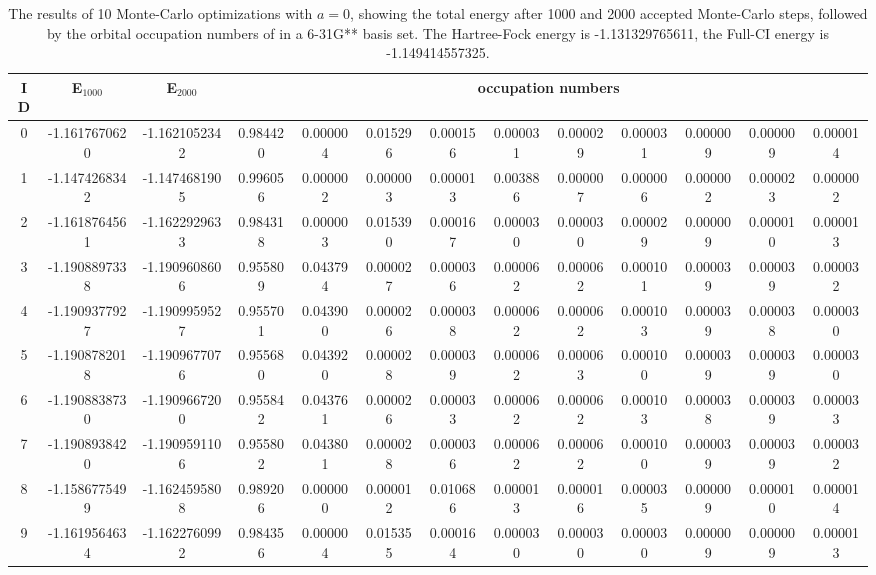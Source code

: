 \documentclass[pra,nofootinbib]{revtex4-1}
\newcommand{\dlabel}[1]{\text{#1}\label{#1}}
\begin{document}
\begin{table}
\begin{tabular}{|c|c|c|cccccccccc|}
\hline\hline 
ID & E$_{1000}$ & E$_{2000}$ & \multicolumn{10}{c}{occupation numbers} \\
\hline 
0 & -1.1617670620 & -1.1621052342 & 0.984420 & 0.000004 & 0.015296 & 0.000156 & 0.000031 & 0.000029 & 0.000031 & 0.000009 & 0.000009 & 0.000014 \\
1 & -1.1474268342 & -1.1474681905 & 0.996056 & 0.000002 & 0.000003 & 0.000013 & 0.003886 & 0.000007 & 0.000006 & 0.000002 & 0.000023 & 0.000002 \\
2 & -1.1618764561 & -1.1622929633 & 0.984318 & 0.000003 & 0.015390 & 0.000167 & 0.000030 & 0.000030 & 0.000029 & 0.000009 & 0.000010 & 0.000013 \\
3 & -1.1908897338 & -1.1909608606 & 0.955809 & 0.043794 & 0.000027 & 0.000036 & 0.000062 & 0.000062 & 0.000101 & 0.000039 & 0.000039 & 0.000032 \\
4 & -1.1909377927 & -1.1909959527 & 0.955701 & 0.043900 & 0.000026 & 0.000038 & 0.000062 & 0.000062 & 0.000103 & 0.000039 & 0.000038 & 0.000030 \\
5 & -1.1908782018 & -1.1909677076 & 0.955680 & 0.043920 & 0.000028 & 0.000039 & 0.000062 & 0.000063 & 0.000100 & 0.000039 & 0.000039 & 0.000030 \\
6 & -1.1908838730 & -1.1909667200 & 0.955842 & 0.043761 & 0.000026 & 0.000033 & 0.000062 & 0.000062 & 0.000103 & 0.000038 & 0.000039 & 0.000033 \\
7 & -1.1908938420 & -1.1909591106 & 0.955802 & 0.043801 & 0.000028 & 0.000036 & 0.000062 & 0.000062 & 0.000100 & 0.000039 & 0.000039 & 0.000032 \\
8 & -1.1586775499 & -1.1624595808 & 0.989206 & 0.000000 & 0.000012 & 0.010686 & 0.000013 & 0.000016 & 0.000035 & 0.000009 & 0.000010 & 0.000014 \\
9 & -1.1619564634 & -1.1622760992 & 0.984356 & 0.000004 & 0.015355 & 0.000164 & 0.000030 & 0.000030 & 0.000030 & 0.000009 & 0.000009 & 0.000013 \\
\hline\hline
\end{tabular}
\dlabel{Table:MCRenorm}
\caption{The results of 10 Monte-Carlo optimizations with $a=0$, showing the total energy after 1000 and 2000 
accepted Monte-Carlo steps, followed by the orbital occupation numbers of  in a 6-31G** basis
set. The Hartree-Fock energy is -1.131329765611, the Full-CI energy is -1.149414557325.}
\end{table}
\end{document}
